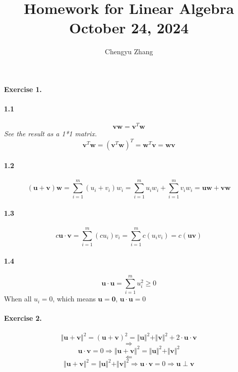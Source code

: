 \documentclass{article}
\title{\vspace*{-3.5cm}Homework for Linear Algebra \\October 24, 2024}
\author{Chengyu Zhang}
\date{}
\begin{document}
\maketitle

\paragraph{Exercise 1.}
    \paragraph{1.1}
        \textit{
            \[
            \mathbf{v}\mathbf{w}=\mathbf{v}^T\mathbf{w}
            \]
            See the result as a 1*1 matrix.
            \[
            \mathbf{v}^T\mathbf{w}=(\mathbf{v}^T\mathbf{w})^T=\mathbf{w}^T\mathbf{v}=\mathbf{w}\mathbf{v}
            \]
        }
    \paragraph{1.2}
        \[
        (\mathbf{u}+\mathbf{v})\mathbf{w}=\sum_{i=1}^{m}(u_i+v_i)w_i=\sum_{i=1}^{m}u_iw_i+\sum_{i=1}^{m}v_iw_i=\mathbf{u}\mathbf{w}+\mathbf{v}\mathbf{w} 
        \]
    \paragraph{1.3}
        \[
        c\mathbf{u}\cdot\mathbf{v}=\sum_{i=1}^{m}(cu_i)v_i=\sum_{i=1}^{m}c(u_iv_i)=c(\mathbf{u}\mathbf{v})
        \]
    \paragraph{1.4}
        \[
        \mathbf{u}\cdot \mathbf{u}=\sum_{i=1}^{m} u_i^2 \geq 0
        \]
    When all $u_i=0$, which means $\mathbf{u}=\mathbf{0}$, $\mathbf{u}\cdot \mathbf{u}=0$
\paragraph{Exercise 2.}
    \[
    \Vert \mathbf{u}+\mathbf{v} \Vert^2 = ( \mathbf{u}+\mathbf{v} )^2 =  \Vert \mathbf{u} \Vert^2 +  \Vert \mathbf{v} \Vert^2 + 2\cdot \mathbf{u}\cdot\mathbf{v}
    \]
    \[
    \Rightarrow 
    \]
    \[
    \mathbf{u}\cdot\mathbf{v}=0 \Rightarrow \Vert \mathbf{u}+\mathbf{v} \Vert^2 =  \Vert \mathbf{u} \Vert^2 +  \Vert \mathbf{v} \Vert^2
    \]
    \[
    \Leftarrow
    \]
    \[
        \Vert \mathbf{u}+\mathbf{v} \Vert^2 =  \Vert \mathbf{u} \Vert^2 +  \Vert \mathbf{v} \Vert^2 \Rightarrow  \mathbf{u}\cdot\mathbf{v}=0 \Rightarrow \mathbf{u} \perp \mathbf{v}
    \]
\end{document}
